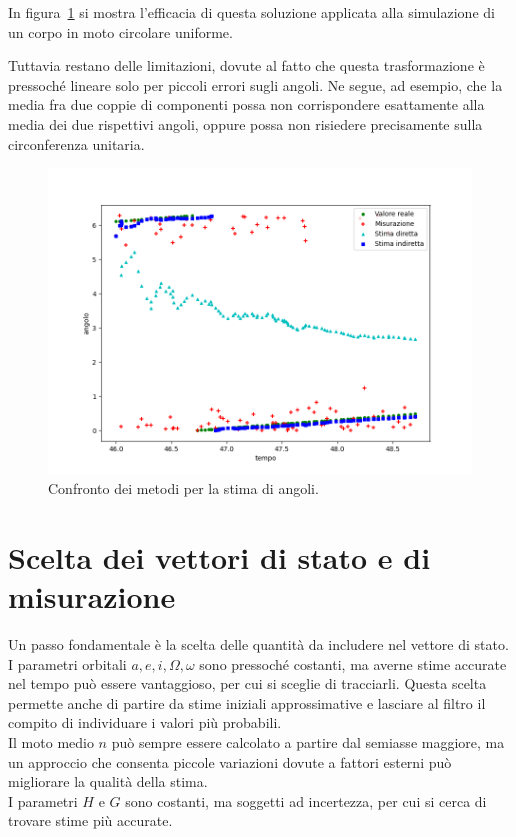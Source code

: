 \documentclass[12pt,a4paper,openright,twoside]{book}
\begin{document}
In figura~\ref{fig:angle-method-comparison} si mostra l'efficacia di questa soluzione applicata alla simulazione di un corpo in moto circolare uniforme.

Tuttavia restano delle limitazioni, dovute al fatto che questa trasformazione è pressoché lineare solo per piccoli errori sugli angoli. Ne segue, ad esempio, che la media fra due coppie di componenti possa non corrispondere esattamente alla media dei due rispettivi angoli, oppure possa non risiedere precisamente sulla circonferenza unitaria.

\begin{figure}
    \centering
    \includegraphics[width=\linewidth]{figures/angle-method-comparison.png}
    \caption{Confronto dei metodi per la stima di angoli.}
    \label{fig:angle-method-comparison}
    \vspace{2\baselineskip}
\end{figure}

\section{Scelta dei vettori di stato e di misurazione}

Un passo fondamentale è la scelta delle quantità da includere nel vettore di stato. I parametri orbitali $a,e,i,\Omega,\omega$ sono pressoché costanti, ma averne stime accurate nel tempo può essere vantaggioso, per cui si sceglie di tracciarli. Questa scelta permette anche di partire da stime iniziali approssimative e lasciare al filtro il compito di individuare i valori più probabili. \\
Il moto medio $n$ può sempre essere calcolato a partire dal semiasse maggiore, ma un approccio che consenta piccole variazioni dovute a fattori esterni può migliorare la qualità della stima. \\
I parametri $H$ e $G$ sono costanti, ma soggetti ad incertezza, per cui si cerca di trovare stime più accurate. \\
\end{document}
